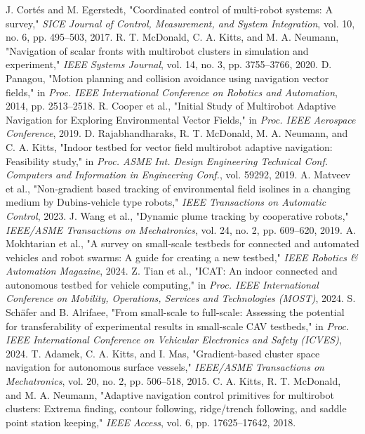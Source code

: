  J. Cortés and M. Egerstedt, "Coordinated control of multi-robot systems: A survey," \textit{SICE Journal of Control, Measurement, and System Integration}, vol. 10, no. 6, pp. 495--503, 2017.
 R. T. McDonald, C. A. Kitts, and M. A. Neumann, "Navigation of scalar fronts with multirobot clusters in simulation and experiment," \textit{IEEE Systems Journal}, vol. 14, no. 3, pp. 3755--3766, 2020.
 D. Panagou, "Motion planning and collision avoidance using navigation vector fields," in \textit{Proc. IEEE International Conference on Robotics and Automation}, 2014, pp. 2513--2518.
 R. Cooper et al., "Initial Study of Multirobot Adaptive Navigation for Exploring Environmental Vector Fields," in \textit{Proc. IEEE Aerospace Conference}, 2019.
 D. Rajabhandharaks, R. T. McDonald, M. A. Neumann, and C. A. Kitts, "Indoor testbed for vector field multirobot adaptive navigation: Feasibility study," in \textit{Proc. ASME Int. Design Engineering Technical Conf. Computers and Information in Engineering Conf.}, vol. 59292, 2019.
 A. Matveev et al., "Non-gradient based tracking of environmental field isolines in a changing medium by Dubins-vehicle type robots," \textit{IEEE Transactions on Automatic Control}, 2023.
 J. Wang et al., "Dynamic plume tracking by cooperative robots," \textit{IEEE/ASME Transactions on Mechatronics}, vol. 24, no. 2, pp. 609--620, 2019.
 A. Mokhtarian et al., "A survey on small-scale testbeds for connected and automated vehicles and robot swarms: A guide for creating a new testbed," \textit{IEEE Robotics \& Automation Magazine}, 2024.
 Z. Tian et al., "ICAT: An indoor connected and autonomous testbed for vehicle computing," in \textit{Proc. IEEE International Conference on Mobility, Operations, Services and Technologies (MOST)}, 2024.
 S. Schäfer and B. Alrifaee, "From small-scale to full-scale: Assessing the potential for transferability of experimental results in small-scale CAV testbeds," in \textit{Proc. IEEE International Conference on Vehicular Electronics and Safety (ICVES)}, 2024.
 T. Adamek, C. A. Kitts, and I. Mas, "Gradient-based cluster space navigation for autonomous surface vessels," \textit{IEEE/ASME Transactions on Mechatronics}, vol. 20, no. 2, pp. 506--518, 2015.
 C. A. Kitts, R. T. McDonald, and M. A. Neumann, "Adaptive navigation control primitives for multirobot clusters: Extrema finding, contour following, ridge/trench following, and saddle point station keeping," \textit{IEEE Access}, vol. 6, pp. 17625--17642, 2018.
